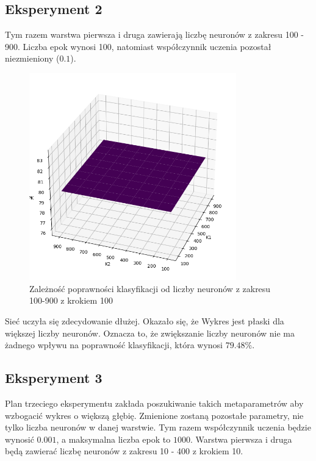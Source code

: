 \documentclass{article}
\begin{document}
\subsection{Eksperyment 2}
Tym razem warstwa pierwsza i druga zawierają liczbę neuronów z zakresu 100 - 900.
Liczba epok wynosi 100, natomiast współczynnik uczenia pozostał niezmieniony ($0.1$).
\begin{figure}[H]
    \centering
    \includegraphics[width=0.8\textwidth, keepaspectratio]{k1_k2_dobre_900k1k2_echo100.png}
    \caption{Zależność poprawności klasyfikacji od liczby neuronów z zakresu 100-900 z krokiem 100}
    \label{fig:k1k2_2}
\end{figure}

Sieć uczyła się zdecydowanie dłużej.
Okazało się, że Wykres jest płaski dla większej liczby neuronów.
Oznacza to, że zwiększanie liczby neuronów nie ma żadnego wpływu na poprawność klasyfikacji, która wynosi $79.48\%$.

\newpage
\subsection{Eksperyment 3}
Plan trzeciego eksperymentu zakłada poszukiwanie takich metaparametrów aby wzbogacić wykres o większą głębię.
Zmienione zostaną pozostałe parametry, nie tylko liczba neuronów w danej warstwie.
Tym razem współczynnik uczenia będzie wynosić $0.001$, a maksymalna liczba epok to $1000$.
Warstwa pierwsza i druga będą zawierać liczbę neuronów z zakresu 10 - 400 z krokiem 10.
\end{document}
